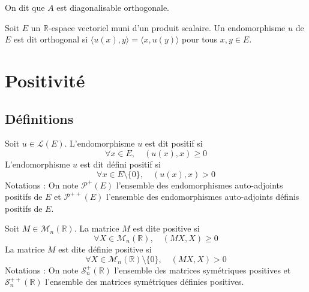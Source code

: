 \begin{remark}

On dit que $A$ est diagonalisable orthogonale.

\end{remark}

\begin{definition}
\label{def:15}

Soit $E$ un $\mathbb{R}$-espace vectoriel muni d'un produit scalaire. Un endomorphisme $u$ de $E$ est dit orthogonal si $\langle u(x), y \rangle = \langle x, u(y) \rangle$ pour tous $x, y \in E$.


\end{definition}

\section{Positivité}

\subsection{Définitions}

\begin{definition}
\label{def:16}

Soit $u \in \mathcal{L}(E)$. L'endomorphisme $u$ est dit positif si
\[
\forall x \in E, \quad (u(x),x) \geq 0
\]
L'endomorphisme $u$ est dit défini positif si
\[
\forall x \in E \setminus \{0\}, \quad (u(x),x) > 0
\]
Notations : On note $\mathcal{P}^{+}(E)$ l'ensemble des endomorphismes auto-adjoints positifs de $E$ et
$\mathcal{P}^{++}(E)$ l'ensemble des endomorphismes auto-adjoints définis positifs de $E$.

\end{definition}

\begin{definition}
\label{def:17}

Soit $M \in \mathcal{M}_n(\mathbb{R})$. La matrice $M$ est dite positive si
\[
\forall X \in \mathcal{M}_n(\mathbb{R}), \quad (MX,X) \geq 0
\]
La matrice $M$ est dite définie positive si
\[
\forall X \in \mathcal{M}_n(\mathbb{R}) \setminus \{0\}, \quad (MX,X) > 0
\]
Notations : On note $\mathcal{S}_n^{+}(\mathbb{R})$ l'ensemble des matrices symétriques positives et $\mathcal{S}_n^{++}(\mathbb{R})$ l'ensemble des matrices symétriques définies positives.

\end{definition}

